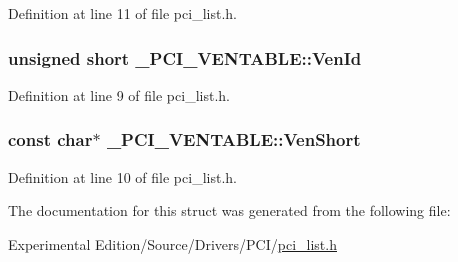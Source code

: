 Definition at line 11 of file pci\+\_\+list.\+h.

\subsubsection[{\texorpdfstring{Ven\+Id}{VenId}}]{\setlength{\rightskip}{0pt plus 5cm}unsigned short \+\_\+\+P\+C\+I\+\_\+\+V\+E\+N\+T\+A\+B\+L\+E\+::\+Ven\+Id}\hypertarget{struct__PCI__VENTABLE_a8df580b1447df15ebe8a128b8225e710}{}\label{struct__PCI__VENTABLE_a8df580b1447df15ebe8a128b8225e710}


Definition at line 9 of file pci\+\_\+list.\+h.

\subsubsection[{\texorpdfstring{Ven\+Short}{VenShort}}]{\setlength{\rightskip}{0pt plus 5cm}const char$\ast$ \+\_\+\+P\+C\+I\+\_\+\+V\+E\+N\+T\+A\+B\+L\+E\+::\+Ven\+Short}\hypertarget{struct__PCI__VENTABLE_a37c44257d4237ef312626d97ef3a5fa5}{}\label{struct__PCI__VENTABLE_a37c44257d4237ef312626d97ef3a5fa5}


Definition at line 10 of file pci\+\_\+list.\+h.



The documentation for this struct was generated from the following file\+:\begin{DoxyCompactItemize}
\item 
Experimental Edition/\+Source/\+Drivers/\+P\+C\+I/\hyperlink{pci__list_8h}{pci\+\_\+list.\+h}\end{DoxyCompactItemize}
